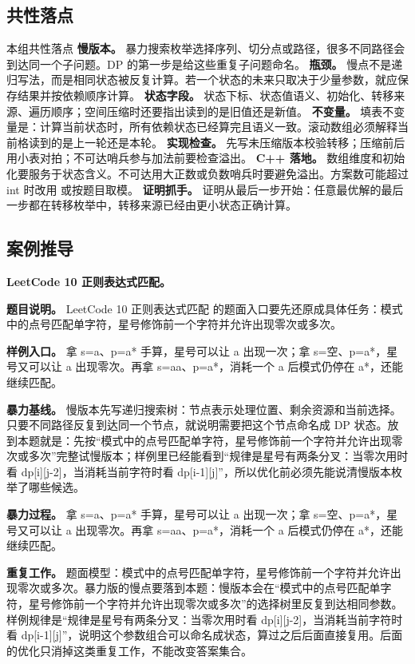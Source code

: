 \subsection{共性落点}

\begin{principlebox}{本组共性落点}
\textbf{慢版本。} 暴力搜索枚举选择序列、切分点或路径，很多不同路径会到达同一个子问题。DP 的第一步是给这些重复子问题命名。
\textbf{瓶颈。} 慢点不是递归写法，而是相同状态被反复计算。若一个状态的未来只取决于少量参数，就应保存结果并按依赖顺序计算。
\textbf{状态字段。} 状态下标、状态值语义、初始化、转移来源、遍历顺序；空间压缩时还要指出读到的是旧值还是新值。
\textbf{不变量。} 填表不变量是：计算当前状态时，所有依赖状态已经算完且语义一致。滚动数组必须解释当前格读到的是上一轮还是本轮。
\textbf{实现检查。} 先写未压缩版本校验转移；压缩前后用小表对拍；不可达哨兵参与加法前要检查溢出。
\textbf{C++ 落地。} 数组维度和初始化要服务于状态含义。不可达用大正数或负数哨兵时要避免溢出。方案数可能超过 int 时改用  或按题目取模。
\textbf{证明抓手。} 证明从最后一步开始：任意最优解的最后一步都在转移枚举中，转移来源已经由更小状态正确计算。
\end{principlebox}

\subsection{案例推导}

\noindent\textbf{LeetCode 10 正则表达式匹配。}

\textbf{题目说明。} LeetCode 10 正则表达式匹配 的题面入口要先还原成具体任务：模式中的点号匹配单字符，星号修饰前一个字符并允许出现零次或多次。

\textbf{样例入口。} 拿 s=a、p=a* 手算，星号可以让 a 出现一次；拿 s=空、p=a*，星号又可以让 a 出现零次。再拿 s=aa、p=a*，消耗一个 a 后模式仍停在 a*，还能继续匹配。

\textbf{暴力基线。} 慢版本先写递归搜索树：节点表示处理位置、剩余资源和当前选择。只要不同路径反复到达同一个节点，就说明需要把这个节点命名成 DP 状态。放到本题就是：先按“模式中的点号匹配单字符，星号修饰前一个字符并允许出现零次或多次”完整试慢版本；样例里已经能看到“规律是星号有两条分叉：当零次用时看 dp[i][j-2]，当消耗当前字符时看 dp[i-1][j]”，所以优化前必须先能说清慢版本枚举了哪些候选。

\textbf{暴力过程。} 拿 s=a、p=a* 手算，星号可以让 a 出现一次；拿 s=空、p=a*，星号又可以让 a 出现零次。再拿 s=aa、p=a*，消耗一个 a 后模式仍停在 a*，还能继续匹配。

\textbf{重复工作。} 题面模型：模式中的点号匹配单字符，星号修饰前一个字符并允许出现零次或多次。暴力版的慢点要落到本题：慢版本会在“模式中的点号匹配单字符，星号修饰前一个字符并允许出现零次或多次”的选择树里反复到达相同参数。样例规律是“规律是星号有两条分叉：当零次用时看 dp[i][j-2]，当消耗当前字符时看 dp[i-1][j]”，说明这个参数组合可以命名成状态，算过之后后面直接复用。后面的优化只消掉这类重复工作，不能改变答案集合。

